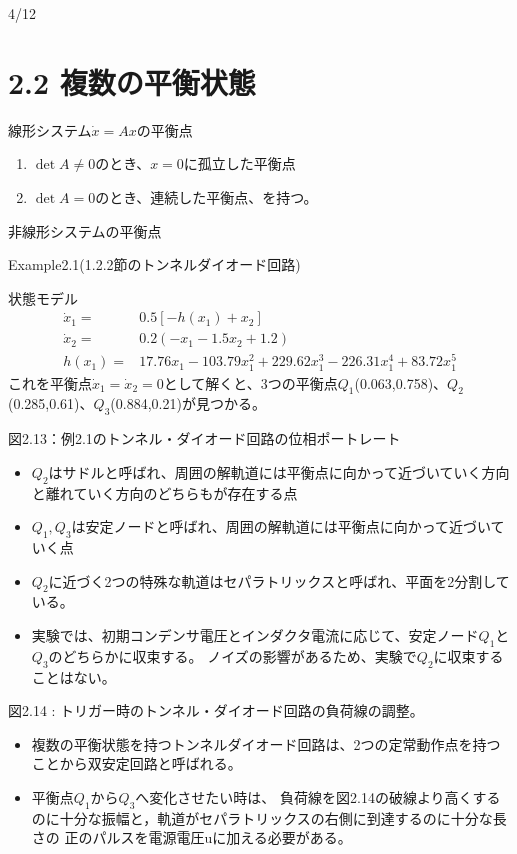 \documentclass{jsarticle}
\begin{document}
4/12

\section*{2.2 複数の平衡状態}

線形システム$\dot x =Ax$の平衡点 
\begin{enumerate}
  \item $\det A \neq 0$のとき、$x=0$に孤立した平衡点
  \item $\det A = 0$のとき、連続した平衡点、を持つ。
\end{enumerate}

非線形システムの平衡点

Example2.1(1.2.2節のトンネルダイオード回路)

状態モデル
\begin{align*}
  \dot x_1 =& 0.5[-h(x_1)+x_2]\\
  \dot x_2 =& 0.2(-x_1-1.5x_2+1.2)\\
  h(x_1) =& 17.76x_1-103.79x_1^2+229.62x_1^3-226.31x_1^4+83.72x_1^5
\end{align*}
これを平衡点$\dot x_1=\dot x_2=0$として解くと、3つの平衡点$Q_1$(0.063,0.758)、$Q_2$(0.285,0.61)、$Q_3$(0.884,0.21)が見つかる。

図2.13：例2.1のトンネル・ダイオード回路の位相ポートレート
\begin{itemize}
  \item $Q_2$はサドルと呼ばれ、周囲の解軌道には平衡点に向かって近づいていく方向と離れていく方向のどちらもが存在する点
  \item $Q_1,Q_3$は安定ノードと呼ばれ、周囲の解軌道には平衡点に向かって近づいていく点
  \item $Q_2$に近づく2つの特殊な軌道はセパラトリックスと呼ばれ、平面を2分割している。
  \item 実験では、初期コンデンサ電圧とインダクタ電流に応じて、安定ノード$Q_1$と$Q_3$のどちらかに収束する。
  ノイズの影響があるため、実験で$Q_2$に収束することはない。
\end{itemize}

図2.14 : トリガー時のトンネル・ダイオード回路の負荷線の調整。
\begin{itemize}
  \item 複数の平衡状態を持つトンネルダイオード回路は、2つの定常動作点を持つことから双安定回路と呼ばれる。
  \item 平衡点$Q_1$から$Q_3$へ変化させたい時は、
  負荷線を図2.14の破線より高くするのに十分な振幅と，軌道がセパラトリックスの右側に到達するのに十分な長さの
  正のパルスを電源電圧uに加える必要がある。
\end{itemize}
\end{document}
